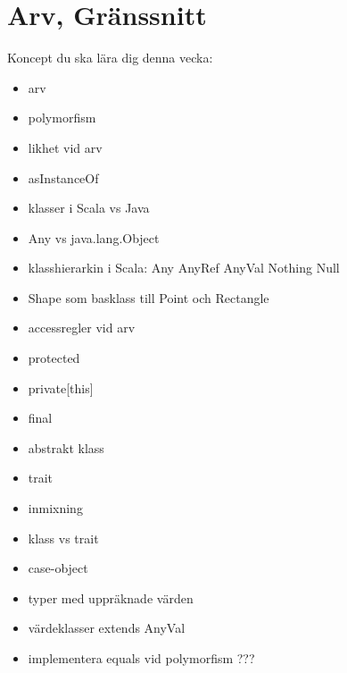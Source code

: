 \chapter{Arv, Gränssnitt}\label{chapter:W07}
Koncept du ska lära dig denna vecka:
\begin{multicols}{2}\begin{itemize}[nosep,label={$\square$},leftmargin=*]
\item arv
\item polymorfism
\item likhet vid arv
\item asInstanceOf
\item klasser i Scala vs Java
\item Any vs java.lang.Object
\item klasshierarkin i Scala: Any AnyRef AnyVal Nothing Null
\item Shape som basklass till Point och Rectangle
\item accessregler vid arv
\item protected
\item private[this]
\item final
\item abstrakt klass
\item trait
\item inmixning
\item klass vs trait
\item case-object
\item typer med uppräknade värden
\item värdeklasser extends AnyVal
\item implementera equals vid polymorfism ???\end{itemize}\end{multicols}
